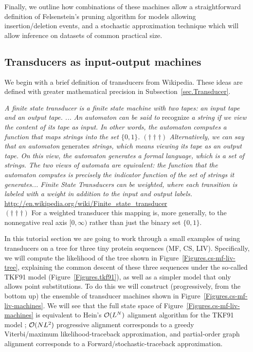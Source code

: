 \documentclass{article}
\newcommand{\secref}[1]{Subsection~\ref{sec.#1}}
\newcommand{\figref}[1]{Figure~\ref{Figures.#1}}
\begin{document}
Finally, we outline how combinations of these machines allow a straightforward definition
of Felsenstein's pruning algorithm for models allowing insertion/deletion events,
and a stochastic approximation technique which will allow inference on datasets
of common practical size.  

\subsection{Transducers as input-output machines}

We begin with a brief definition of transducers from Wikipedia.  
These ideas are defined with greater mathematical precision in \secref{Transducer}.

{\em A finite state transducer is a finite state machine with two tapes: an input tape and an output tape. ... An automaton can be said to } recognize {\em a string if we view the content of its tape as input. In other words, the automaton computes a function that maps strings into the set $\{0,1\}$. $(\dagger\dagger\dagger)$ Alternatively, we can say that an automaton } generates {\em strings, which means viewing its tape as an output tape. On this view, the automaton generates a formal language, which is a set of strings. The two views of automata are equivalent: the function that the automaton computes is precisely the indicator function of the set of strings it generates... Finite State Transducers can be weighted, where each transition is labeled with a weight in addition to the input and output labels. }
\url{http://en.wikipedia.org/wiki/Finite_state_transducer}
\\
$(\dagger\dagger\dagger)$ For a weighted transducer this mapping is,
more generally, to the nonnegative real axis $[0,\infty)$
rather than just the binary set $\{0,1\}$.

In this tutorial section we are going to work through a small examples of using transducers on a tree
for three tiny protein sequences (MF, CS, LIV).
Specifically, we will compute the likelihood of the tree shown in \figref{cs-mf-liv-tree},
explaining the common descent of these three sequences
under the so-called TKF91 model (\figref{tkf91}),
as well as a simpler model that only allows point substitutions.
To do this we will construct (progressively, from the bottom up) the ensemble of transducer machines shown in \figref{cs-mf-liv-machines}.
We will see that the full state space of \figref{cs-mf-liv-machines} is equivalent to Hein's ${\cal O}(L^N)$ alignment algorithm for the TKF91 model \cite{Hein2001};
${\cal O}(NL^2)$ progressive alignment corresponds to a greedy Viterbi/maximum likelihood-traceback approximation,
and partial-order graph alignment corresponds to a Forward/stochastic-traceback approximation.
\end{document}
